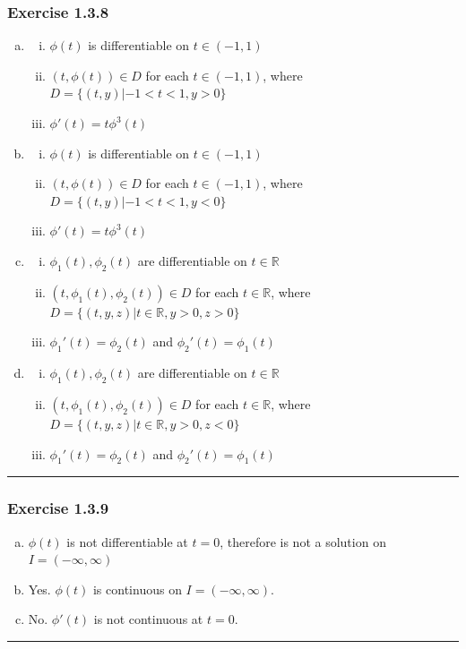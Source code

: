 \documentclass[12pt, letterpaper]{scrartcl}
\newcommand{\R}{\mathbb{R}}
\begin{document}
\subsubsection*{Exercise 1.3.8}
\begin{enumerate}[(a)]
    \item 
    \begin{enumerate}[i.]
        \item $\phi(t)$ is differentiable on $t\in(-1,1)$
        \item $(t,\phi(t))\in D$ for each $t\in(-1,1)$, where $D=\{(t,y)| -1<t<1, y>0\}$
        \item $\phi'(t)=t\phi^3(t)$
    \end{enumerate}
    \item
    \begin{enumerate}[i.]
        \item $\phi(t)$ is differentiable on $t\in(-1,1)$
        \item $(t,\phi(t))\in D$ for each $t\in(-1,1)$, where $D=\{(t,y)| -1<t<1, y<0\}$
        \item $\phi'(t)=t\phi^3(t)$
    \end{enumerate}
    \item
    \begin{enumerate}[i.]
        \item $\phi_1(t), \phi_2(t)$ are differentiable on $t\in\R$
        \item $(t,\phi_1(t), \phi_2(t))\in D$ for each $t\in\R$, where $D=\{(t,y,z)| t\in\R, y>0, z>0\}$
        \item $\phi_1'(t)=\phi_2(t)$ and $\phi_2'(t)=\phi_1(t)$
    \end{enumerate}
    \item 
    \begin{enumerate}[i.]
        \item $\phi_1(t), \phi_2(t)$ are differentiable on $t\in\R$
        \item $(t,\phi_1(t), \phi_2(t))\in D$ for each $t\in\R$, where $D=\{(t,y,z)| t\in\R, y>0, z<0\}$
        \item $\phi_1'(t)=\phi_2(t)$ and $\phi_2'(t)=\phi_1(t)$
    \end{enumerate}
\end{enumerate}
\vskip1mm\hrule

\subsubsection*{Exercise 1.3.9}
    \begin{enumerate}[(a)]
    \item $\phi(t)$ is not differentiable at $t=0$, therefore is not a solution on $I=(-\infty, \infty)$
    \item Yes. $\phi(t)$ is continuous on $I=(-\infty, \infty)$.
    \item No. $\phi'(t)$ is not continuous at $t=0$.
    \end{enumerate}
\vskip1mm\hrule
\end{document}

